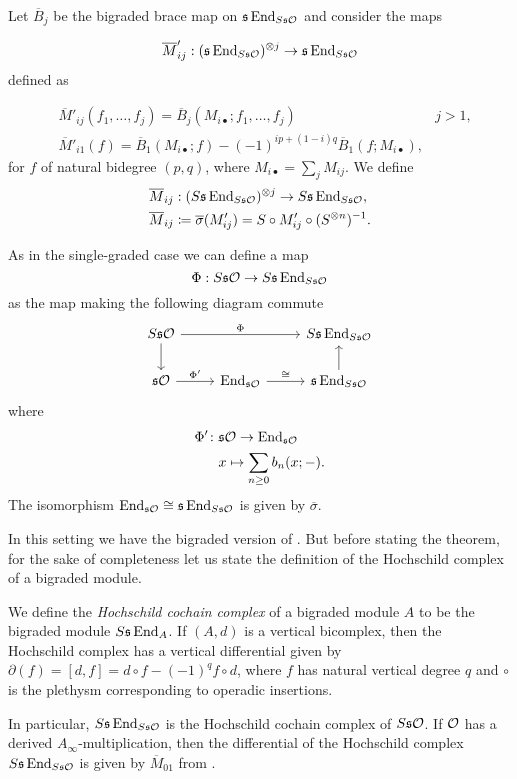 \documentclass[Thesis.tex]{subfiles}
\begin{document}
Let $\overline{B}_j$ be the bigraded brace map on $\mathfrak{s}\operatorname{End}_{S\mathfrak{s}{\mathcal O}}$ and consider the maps

\begin{equation}\label{barbimaps}
\overline{M}'_{ij}:(\mathfrak{s}\operatorname{End}_{S\mathfrak{s}{\mathcal O}})^{\otimes j}\to \mathfrak{s}\operatorname{End}_{S\mathfrak{s}{\mathcal O}}
\end{equation}
defined as 

\begin{align*}
&\overline{M}'_{ij}(f_1,\dots,f_j)=\overline{B}_j(M_{i\bullet};f_1,\dots, f_j) & j>1,\\
&\overline{M}'_{i1}(f)=\overline{B}_1(M_{i\bullet};f)-(-1)^{ip+(1-i)q}\overline{B}_1(f;M_{i\bullet}),
\end{align*}
for $f$ of natural bidegree $(p,q)$, where $M_{i\bullet}=\sum_j M_{ij}$. We define 
\begin{align*}
\overline{M}_{ij}& :(S\mathfrak{s}\operatorname{End}_{S\mathfrak{s}{\mathcal O}})^{\otimes j}\to S\mathfrak{s}\operatorname{End}_{S\mathfrak{s}{\mathcal O}},\\
 \overline{M}_{ij}& \coloneqq \overline{\sigma}(M'_{ij})=S\circ M'_{ij}\circ (S^{\otimes n})^{-1}.
\end{align*}

As in the single-graded case we can define a map
\[\Phi:S\mathfrak{s}{\mathcal O}\to S\mathfrak{s}\operatorname{End}_{S\mathfrak{s}{\mathcal O}}\]
as the map making the following diagram commute
\begin{equation}\label{derivedPhi}
\begin{tikzcd}
S\s\OO\arrow[rr, "\Phi"]\arrow[d] & & S\s\End_{S\s\OO}\\
\s\OO\arrow[r, "\Phi'"]& \End_{\s\OO}\arrow[r, "\cong"]& \s\End_{S\s\OO}\arrow[u]
\end{tikzcd}
\end{equation}
where 
\begin{align*}
\Phi'\colon&\mathfrak{s}{\mathcal O} \to \operatorname{End}_{\mathfrak{s}{\mathcal O}}\\
&x\mapsto \sum_{n\geq 0}b_n(x;-).
\end{align*}
The isomorphism $\operatorname{End}_{\mathfrak{s}{\mathcal O}}\cong\mathfrak{s}\operatorname{End}_{S\mathfrak{s}{\mathcal O}}$ is given by $\overline{\sigma}$. 

In this setting we have the bigraded version of . But before stating the theorem, for the sake of completeness let us state the definition of the Hochschild complex of a bigraded module.

\begin{defin}
We define the \emph{Hochschild cochain complex} of a bigraded module $A$ to be the bigraded module $S\mathfrak{s}\operatorname{End}_A$. If $(A,d)$ is a vertical bicomplex, then the Hochschild complex has a vertical differential given by $\partial(f)=[d,f]=d\circ f-(-1)^{q}f\circ d$, where $f$ has natural vertical degree $q$ and $\circ$ is the plethysm corresponding to operadic insertions.
\end{defin}
In particular, $S\mathfrak{s}\operatorname{End}_{S\mathfrak{s}{\mathcal O}}$ is the Hochschild cochain complex of $S\mathfrak{s}{\mathcal O}$. If ${\mathcal O}$ has a derived $A_\infty$-multiplication, then the differential of the Hochschild complex $S\mathfrak{s}\operatorname{End}_{S\mathfrak{s}{\mathcal O}}$ is given by $\overline{M}_{01}$ from .
\end{document}
